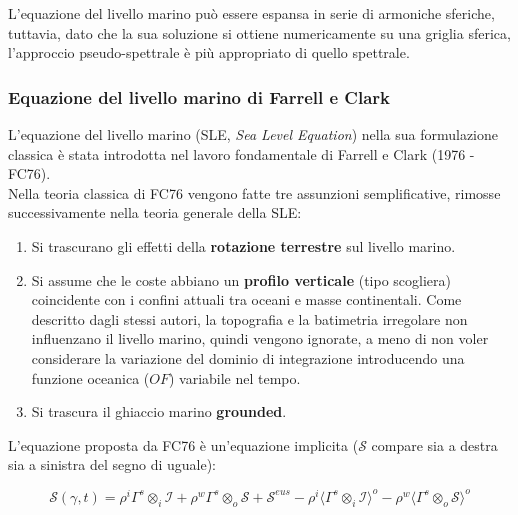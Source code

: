 \documentclass[a4paper,12pt]{book}
\begin{document}
\noindent L'equazione del livello marino può essere espansa in serie di armoniche sferiche,
tuttavia, dato che la sua soluzione si ottiene numericamente su una griglia sferica, l'approccio pseudo-spettrale è più appropriato di quello spettrale.

\subsubsection{\textcolor{colore7}{Equazione del livello marino di Farrell e Clark}}

L'equazione del livello marino (SLE, \textit{Sea Level Equation}) nella sua formulazione classica è stata introdotta nel lavoro fondamentale di Farrell e Clark (1976 - FC76).\\

\noindent
Nella teoria classica di FC76 vengono fatte tre assunzioni semplificative, rimosse successivamente nella teoria generale della SLE:

\begin{enumerate}
    \item Si trascurano gli effetti della \textbf{rotazione terrestre} sul livello marino.
    \item Si assume che le coste abbiano un \textbf{profilo verticale} (tipo scogliera) coincidente con i confini attuali tra oceani e masse continentali.
    Come descritto dagli stessi autori, la topografia e la batimetria irregolare non influenzano il livello marino,
    quindi vengono ignorate, a meno di non voler considerare la variazione del dominio di integrazione introducendo una funzione oceanica ($OF$) variabile nel tempo.
    \item Si trascura il ghiaccio marino \textbf{grounded}.
\end{enumerate}

\noindent
L'equazione proposta da FC76 è un'equazione implicita ($\mathcal{S}$ compare sia a destra sia a sinistra del segno di uguale):

\begin{equation}
    \mathcal{S}(\gamma,t) = \rho^i \Gamma^s \otimes_i \mathcal{I} + \rho^w \Gamma^s \otimes_o \mathcal{S} + \mathcal{S}^{eus} - \rho^i \langle \Gamma^s \otimes_i \mathcal{I}\rangle^o - \rho^w \langle\Gamma^s \otimes_o \mathcal{S}\rangle^o
    \label{eq:SLE_FC76}
\end{equation}
\end{document}
